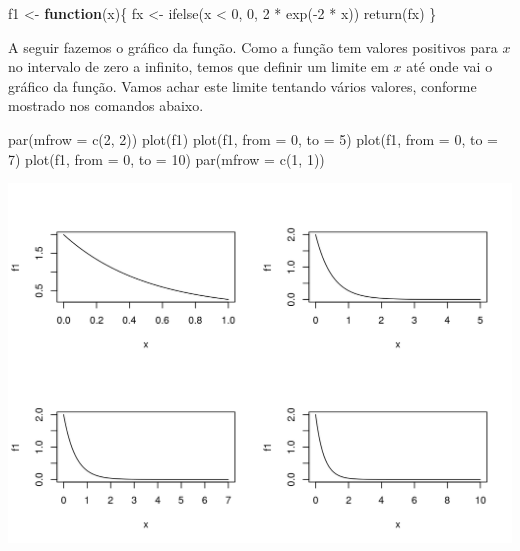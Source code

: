 \documentclass[
  10pt,
  a4paper]{book}
\newenvironment{Shaded}{\begin{snugshade}}{\end{snugshade}}
\newcommand{\AttributeTok}[1]{\textcolor[rgb]{0.77,0.63,0.00}{#1}}
\newcommand{\ControlFlowTok}[1]{\textcolor[rgb]{0.13,0.29,0.53}{\textbf{#1}}}
\newcommand{\DecValTok}[1]{\textcolor[rgb]{0.00,0.00,0.81}{#1}}
\newcommand{\FunctionTok}[1]{\textcolor[rgb]{0.00,0.00,0.00}{#1}}
\newcommand{\NormalTok}[1]{#1}
\newcommand{\OtherTok}[1]{\textcolor[rgb]{0.56,0.35,0.01}{#1}}
\newcommand{\SpecialCharTok}[1]{\textcolor[rgb]{0.00,0.00,0.00}{#1}}
\begin{document}
\begin{Shaded}
\begin{Highlighting}[]
\NormalTok{f1 }\OtherTok{\textless{}{-}} \ControlFlowTok{function}\NormalTok{(x)\{}
\NormalTok{    fx }\OtherTok{\textless{}{-}} \FunctionTok{ifelse}\NormalTok{(x }\SpecialCharTok{\textless{}} \DecValTok{0}\NormalTok{, }\DecValTok{0}\NormalTok{, }\DecValTok{2} \SpecialCharTok{*} \FunctionTok{exp}\NormalTok{(}\SpecialCharTok{{-}}\DecValTok{2} \SpecialCharTok{*}\NormalTok{ x))}
    \FunctionTok{return}\NormalTok{(fx)}
\NormalTok{\}}
\end{Highlighting}
\end{Shaded}

A seguir fazemos o gráfico da função. Como a função tem valores
positivos para \(x\) no intervalo de zero a infinito, temos que definir
um limite em \(x\) até onde vai o gráfico da função. Vamos achar este
limite tentando vários valores, conforme mostrado nos comandos abaixo.

\begin{Shaded}
\begin{Highlighting}[]
\FunctionTok{par}\NormalTok{(}\AttributeTok{mfrow =} \FunctionTok{c}\NormalTok{(}\DecValTok{2}\NormalTok{, }\DecValTok{2}\NormalTok{))}
\FunctionTok{plot}\NormalTok{(f1)}
\FunctionTok{plot}\NormalTok{(f1, }\AttributeTok{from =} \DecValTok{0}\NormalTok{, }\AttributeTok{to =} \DecValTok{5}\NormalTok{)}
\FunctionTok{plot}\NormalTok{(f1, }\AttributeTok{from =} \DecValTok{0}\NormalTok{, }\AttributeTok{to =} \DecValTok{7}\NormalTok{)}
\FunctionTok{plot}\NormalTok{(f1, }\AttributeTok{from =} \DecValTok{0}\NormalTok{, }\AttributeTok{to =} \DecValTok{10}\NormalTok{)}
\FunctionTok{par}\NormalTok{(}\AttributeTok{mfrow =} \FunctionTok{c}\NormalTok{(}\DecValTok{1}\NormalTok{, }\DecValTok{1}\NormalTok{))}
\end{Highlighting}
\end{Shaded}

\begin{center}\includegraphics{figures/unnamed-chunk-329-1} \end{center}
\end{document}
